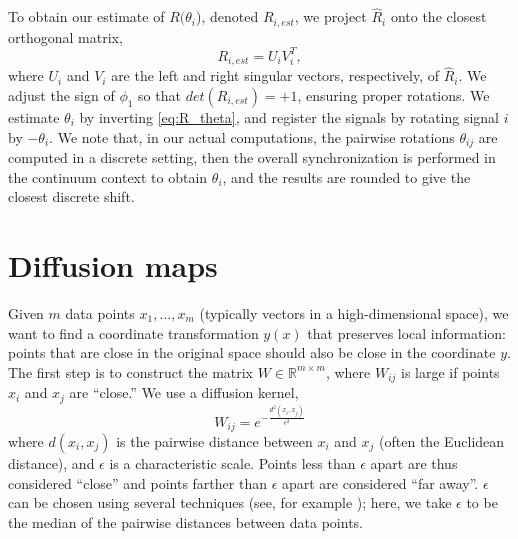 \documentclass{pnastwo}
\begin{document}
\begin{article}
\begin{materials}
%
To obtain our estimate of $R(\theta_i$), denoted $R_{i, est}$, we project $\hat{R}_i$ onto the closest orthogonal matrix, 
\begin{equation} \label{eq:R_est}
R_{i, est} = U_i V_i^T,
\end{equation}
where $U_i$ and $V_i$ are the left and right singular vectors, respectively, of $\hat{R}_i$.
%
We adjust the sign of $\phi_1$ so that $det(R_{i, est}) = +1$, ensuring proper rotations.
%
We estimate $\theta_{i}$ by inverting \eqref{eq:R_theta}, and register the signals by rotating signal $i$ by $-\theta_i$.
%
We note that, in our actual computations, the pairwise rotations $\theta_{ij}$ are computed in a discrete setting, then the overall
synchronization is performed in the continuum context to obtain $\theta_i$, and the results are rounded to give the closest
discrete shift.

%
%
%

\section{Diffusion maps \cite{coifman2005geometric}}

Given $m$ data points $x_1, \dots, x_m$ (typically vectors in a high-dimensional space), we want to find a coordinate transformation $y(x)$ that preserves local information: points that are close in the original space should also be close in the coordinate $y$.
%
The first step is to construct the matrix $W \in \mathbb{R}^{m \times m}$, where $W_{ij}$ is large if points $x_i$ and $x_j$ are ``close.''
%
We use a diffusion kernel,
\begin{equation} \label{eq:dmaps_W}
W_{ij} = e^{ -\frac{d^2(x_i, x_j)}{\epsilon^2}}
\end{equation}
where $d(x_i, x_j)$ is the pairwise distance between $x_i$ and $x_j$ (often the Euclidean distance), and $\epsilon$ is a characteristic scale.
%
Points less than $\epsilon$ apart are thus considered ``close'' and points farther than $\epsilon$ apart are considered ``far away''.
%
$\epsilon$ can be chosen using several techniques (see, for example \cite{coifman2008graph}); here, we take $\epsilon$ to be the median of the pairwise distances between data points.


\end{materials}
\end{article}
\end{document}
